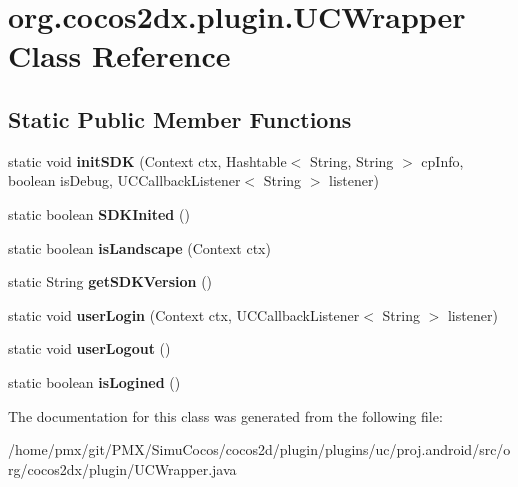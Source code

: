 \hypertarget{classorg_1_1cocos2dx_1_1plugin_1_1UCWrapper}{}\section{org.\+cocos2dx.\+plugin.\+U\+C\+Wrapper Class Reference}
\label{classorg_1_1cocos2dx_1_1plugin_1_1UCWrapper}
\subsection*{Static Public Member Functions}
\begin{DoxyCompactItemize}
\item 
\mbox{\label{classorg_1_1cocos2dx_1_1plugin_1_1UCWrapper_a7afd506deec7098ce45a9913cf1510d0}} 
static void {\bfseries init\+S\+DK} (Context ctx, Hashtable$<$ String, String $>$ cp\+Info, boolean is\+Debug, U\+C\+Callback\+Listener$<$ String $>$ listener)
\item 
\mbox{\label{classorg_1_1cocos2dx_1_1plugin_1_1UCWrapper_a3f40e4c4376d7778f3dc95d5613e7239}} 
static boolean {\bfseries S\+D\+K\+Inited} ()
\item 
\mbox{\label{classorg_1_1cocos2dx_1_1plugin_1_1UCWrapper_ab87d3dbe8f0e26a53032577cee775214}} 
static boolean {\bfseries is\+Landscape} (Context ctx)
\item 
\mbox{\label{classorg_1_1cocos2dx_1_1plugin_1_1UCWrapper_a0836e831058ac30f1a826c28fe2b036c}} 
static String {\bfseries get\+S\+D\+K\+Version} ()
\item 
\mbox{\label{classorg_1_1cocos2dx_1_1plugin_1_1UCWrapper_a0b998422050a4943dbe823a6a2a372a8}} 
static void {\bfseries user\+Login} (Context ctx, U\+C\+Callback\+Listener$<$ String $>$ listener)
\item 
\mbox{\label{classorg_1_1cocos2dx_1_1plugin_1_1UCWrapper_a3e7d653e3b1cac1ee17a7f4982ec123a}} 
static void {\bfseries user\+Logout} ()
\item 
\mbox{\label{classorg_1_1cocos2dx_1_1plugin_1_1UCWrapper_af98217f304aad5649bd3f706247dcc6d}} 
static boolean {\bfseries is\+Logined} ()
\end{DoxyCompactItemize}


The documentation for this class was generated from the following file\+:\begin{DoxyCompactItemize}
\item 
/home/pmx/git/\+P\+M\+X/\+Simu\+Cocos/cocos2d/plugin/plugins/uc/proj.\+android/src/org/cocos2dx/plugin/U\+C\+Wrapper.\+java\end{DoxyCompactItemize}

